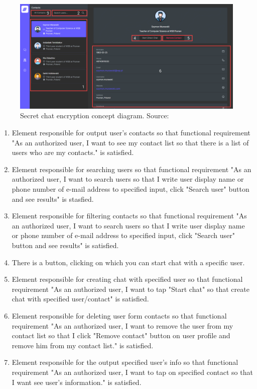 \begin{figure}[H]
    \centering
    \includegraphics[width=1\textwidth]{Pictures/Messenger-2}
    \caption{Secret chat encryption concept diagram. Source: }\label{fig:figure10}
\end{figure}
\begin{enumerate}
    \item Element responsible for output user's contacts so that functional requirement "As an authorized user, I want to see my contact list so that there
    is a list of users who are my contacts." is satisfied.
    \item Element responsible for searching users so that functional requirement "As an authorized user, I want to search users so that
    I write user display name or phone number of e-mail address to specified input, click "Search user" button and see results" is stasfied.
    \item Element responsible for filtering contacts so that functional requirement "As an authorized user, I want to search users so that I write
    user display name or phone number of e-mail address to specified input, click "Search user" button and see results" is satisfied.
    \item There is a button, clicking on which you can start chat with a specific user.
    \item Element responsible for creating chat with specified user so that functional requirement "As an authorized user, I want to tap "Start chat" so that
    create chat with specified user/contact" is satisfied.
    \item Element responsible for deleting user form contacts so that functional requirement "As an authorized user, I want to remove the user from my
    contact list so that I click "Remove contact" button on user profile and remove him from my contact list." is satisfied.
    \item Element responsible for the output specified user's info so that functional requirement "As an authorized user, I want to tap on specified contact
    so that I want see user's information." is satisfied.
\end{enumerate}

